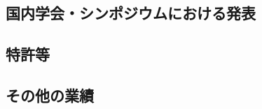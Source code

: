 \subsection{国内学会・シンポジウムにおける発表}
\newcommand{\国内学会やシンポジウムにおける発表}{%

	(以下1件　査読なし・口頭発表)
	\begin{enumerate}
		\item \underline{$\circ$ 栁裕太}、田原康之、大須賀昭彦、清雄一\\
			「画像付きフェイクニュースとジョークニュースの検出・分類に向けた機械学習モデルの検討」、\\
			日本ソフトウェア科学会 2018年度 MACC研究発表会、
			大分、2019年3月
	\end{enumerate}

	(以下1件　査読なし・ポスター発表)
	\begin{enumerate}
		\setcounter{enumi}{1}
		\item \underline{$\circ$ 栁裕太}、葛西透麿、 森谷薫平、神谷岳洋、藤原徹、木村健太、榎本裕介\\
			「CaD428の変異遺伝子の機能解析ツールの汎用化」、\\
			広尾学園高校医進・サイエンスコース研究成果報告会、
			東京、2015年3月
	\end{enumerate}
}

\subsection{特許等}
\newcommand{\特許等}{%

	なし
}

\subsection{その他の業績}
\newcommand{\その他の業績}{%

プレプリント論文

7月開催の国際学会INESに投稿中、採録なら(3)に移管予定

一応通知は5月4日だけどコロナでオンライン開催になるらしいです、ぶっ飛ばずに済んだ……
	\begin{enumerate}
		\item \underline{$\circ$ Yuta Yanagi}, Ryouhei Orihara, Yuichi Sei, Yasuyuki Tahara, and Akihiko Ohsuga.\\
		``Fake news detection with generated comments for news articles''.
		EasyChair Preprint no. 3190, EasyChair, 2020.

	\end{enumerate}
}

